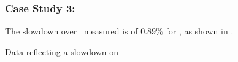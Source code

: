 \subsubsection{Case Study 3: \gobmk}

The slowdown over \llvm\ measured is of $0.89 \%$ for \gobmk, as shown in .

\begin{table}
  \centering
  \begin{tiny}
  
  \end{tiny}
  \caption{Data reflecting a slowdown on \gobmk}
  \label{tab:slowdowngobmk}
\end{table}
